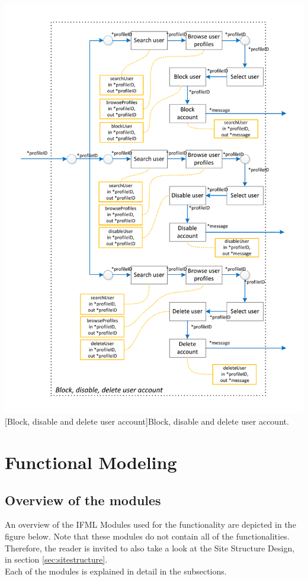 \documentclass[11pt, a4paper,svglistings,oneside]{book}
\begin{document}
$\;$ \\
\noindent\begin{minipage}{\textwidth}
    \centering
   \includegraphics[scale=1]{nav_BlockDisableDelete.pdf}
 [Block, disable and delete user account]{Block, disable and delete user account.}
\end{minipage}

\section{Functional Modeling}

\subsection{Overview of the modules}

An overview of the IFML Modules used for the functionality are depicted in the figure below. Note that these modules do not contain all of the functionalities. Therefore, the reader is invited to also take a look at the Site Structure Design, in section \ref{sec:sitestructure}. \\
Each of the modules is explained in detail in the subsections.
\end{document}

